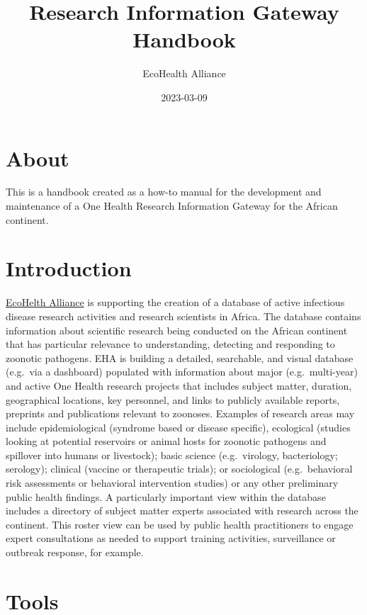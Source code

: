 \documentclass[
]{book}
\title{Research Information Gateway Handbook}
\author{EcoHealth Alliance}
\date{2023-03-09}
\begin{document}
\maketitle

{
\setcounter{tocdepth}{1}
\tableofcontents
}
\hypertarget{about}{%
\chapter{About}\label{about}}

This is a handbook created as a how-to manual for the development and maintenance of a One Health Research Information Gateway for the African continent.

\hypertarget{introduction}{%
\chapter{Introduction}\label{introduction}}

\href{https://www.ecohealthalliance.org/}{EcoHelth Alliance} is supporting the creation of a database of active infectious disease research activities and research scientists in Africa. The database contains information about scientific research being conducted on the African continent that has particular relevance to understanding, detecting and responding to zoonotic pathogens. EHA is building a detailed, searchable, and visual database (e.g.~via a dashboard) populated with information about major (e.g.~multi-year) and active One Health research projects that includes subject matter, duration, geographical locations, key personnel, and links to publicly available reports, preprints and publications relevant to zoonoses. Examples of research areas may include epidemiological (syndrome based or disease specific), ecological (studies looking at potential reservoirs or animal hosts for zoonotic pathogens and spillover into humans or livestock); basic science (e.g.~virology, bacteriology; serology); clinical (vaccine or therapeutic trials); or sociological (e.g.~behavioral risk assessments or behavioral intervention studies) or any other preliminary public health findings. A particularly important view within the database includes a directory of subject matter experts associated with research across the continent. This roster view can be used by public health practitioners to engage expert consultations as needed to support training activities, surveillance or outbreak response, for example.

\hypertarget{tools}{%
\chapter{Tools}\label{tools}}
\end{document}
